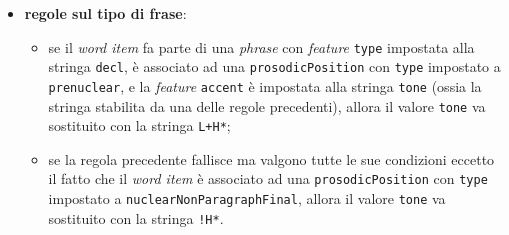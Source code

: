 \begin{itemize}
                    \item \textbf{regole sul tipo di frase}:
                                         \begin{itemize}
                                           \item se il \textit{word item} fa parte di una \textit{phrase} con \textit{feature} 
                                             \texttt{type} impostata alla stringa \texttt{decl}, è associato
                                             ad una \texttt{prosodicPosition} con \texttt{type} impostato a \texttt{prenuclear},
                                             e la \textit{feature} \texttt{accent}
                                             è impostata alla stringa \texttt{tone} (ossia la stringa stabilita da una delle regole precedenti),
                                             allora il valore \texttt{tone} va sostituito con la stringa \texttt{L+H*};
                                           \item se la regola precedente fallisce ma valgono tutte le sue condizioni eccetto il fatto
                                                 che il \textit{word item} è associato
                                                 ad una \texttt{prosodicPosition} con \texttt{type} impostato a \texttt{nuclearNonParagraphFinal},
                                                 allora il valore \texttt{tone} va sostituito con la stringa \texttt{!H*}.
                                         \end{itemize}
                  \end{itemize}

